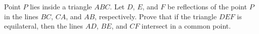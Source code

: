 \documentclass[varwidth]{standalone}
\begin{document}
    Point $P$ lies inside a triangle $ABC$. Let $D$, $E$, and $F$ be reflections of the point $P$ in the lines $BC$, $CA$, and $AB$, respectively. Prove that if the triangle $DEF$ is equilateral, then the lines $AD$, $BE$, and $CF$ intersect in a common point.
\end{document}
